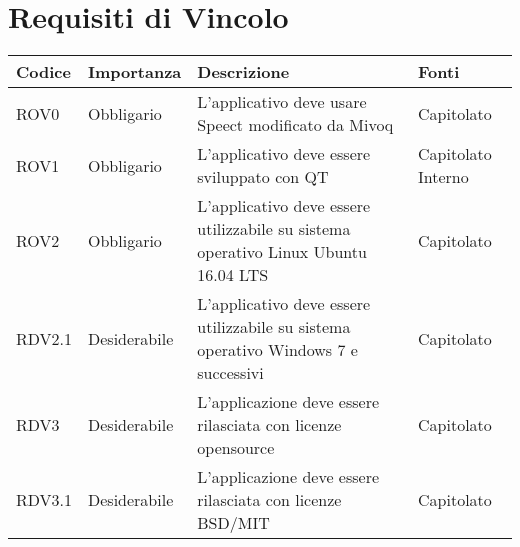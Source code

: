 \documentclass[../AnalisideiRequisiti.tex]{subfiles}
\begin{document}
	\section{Requisiti di Vincolo}
			\begin{longtable}{| p{2cm} | p{2.5cm} |p{5cm} | p{2.5cm} |}
			\hline
			\textbf{Codice} & \textbf{Importanza} & \textbf{Descrizione} & \textbf{Fonti}\\
			\hline
			\endhead
				\newline ROV0&\newline Obbligario&
			\newline 
			L'applicativo deve usare Speect modificato da Mivoq &
			\newline Capitolato
			\\[1em]
			\hline	
			\newline 
			ROV1&\newline Obbligario&
			\newline 
			L'applicativo deve essere sviluppato con QT &
			\newline Capitolato
			\newline Interno
			\\[1em]
			\hline
			\newline 
			ROV2&\newline Obbligario&
			\newline 
			L'applicativo deve essere utilizzabile su sistema operativo Linux Ubuntu 16.04 LTS&
			\newline Capitolato
			\\[1em]
			\hline
			\newline
			RDV2.1&\newline Desiderabile&
			\newline 
			L'applicativo deve essere utilizzabile su sistema operativo Windows 7 e successivi&
			\newline Capitolato
			\\[1em]
			\hline
			\newline
			RDV3&\newline Desiderabile&
			\newline 
			L'applicazione deve essere rilasciata con licenze opensource&
			\newline Capitolato
			\\[1em]
			\hline	
			\newline
			RDV3.1&\newline Desiderabile&
			\newline 
			L'applicazione deve essere rilasciata con licenze BSD/MIT &
			\newline Capitolato
			\\[1em]
			\hline
	\end{longtable}
\end{document}
